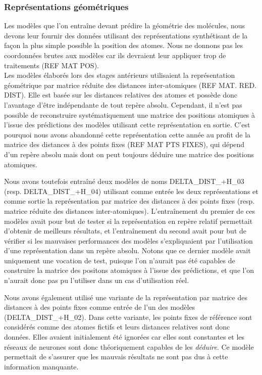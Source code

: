 \subsubsection{Représentations géométriques}
\par Les modèles que l'on entraîne devant prédire la géométrie des molécules, nous devons leur fournir des données utilisant des représentations synthétisant de la façon la plus simple possible la position des atomes. Nous ne donnons pas les coordonnées brutes aux modèles car ils devraient leur appliquer trop de traitements (REF MAT POS).\\
Les modèles élaborés lors des stages antérieurs utilisaient la représentation géométrique par matrice réduite des distances inter-atomiques (REF MAT. RED. DIST). Elle est basée sur les distances relatives des atomes et possède donc l'avantage d'être indépendante de tout repère absolu. Cependant, il n'est pas possible de reconstruire systématiquement une matrice des positions atomiques à l'issue des prédictions des modèles utilisant cette représentation en sortie. C'est pourquoi nous avons abandonné cette représentation cette année au profit de la matrice des distances à des points fixes (REF MAT PTS FIXES), qui dépend d'un repère absolu mais dont on peut toujours déduire une matrice des positions atomiques.\\

\par Nous avons toutefois entraîné deux modèles de noms DELTA\_DIST\_+H\_03 (resp. DELTA\_DIST\_+H\_04) utilisant comme entrée les deux représentations et comme sortie la représentation par matrice des distances à des points fixes (resp. matrice réduite des distances inter-atomiques). L'entraînement du premier de ces modèles avait pour but de tester si la représentation en repère relatif permettait d'obtenir de meilleurs résultats, et l'entraînement du second avait pour but de vérifier si les mauvaises performances des modèles s'expliquaient par l'utilisation d'une représentation dans un repère absolu. Notons que ce dernier modèle avait uniquement une vocation de test, puisque l'on n'aurait pas été capables de construire la matrice des positons atomiques à l'issue des prédictions, et que l'on n'aurait donc pas pu l'utiliser dans un cas d'utilisation réel.\\

\par Nous avons également utilisé une variante de la représentation par matrice des distances à des points fixes comme entrée de l'un des modèles (DELTA\_DIST\_+H\_02). Dans cette variante, les points fixes de référence sont considérés comme des atomes fictifs et leurs distances relatives sont donc données. Elles avaient initialement été ignorées car elles sont constantes et les réseaux de neurones sont donc théoriquement capables de les \emph{déduire}. Ce modèle permettait de s'assurer que les mauvais résultats ne sont pas dus à cette information manquante.

